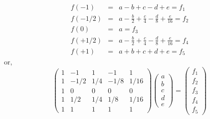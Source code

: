 \begin{eqnarray}
f(-1)   &=& a-b+c-d+e = f_1 \nonumber\\
f(-1/2) &=& a-\frac{b}{2}+\frac{c}{4}-\frac{d}{8}+\frac{e}{16} = f_2 \nonumber\\
f(0)    &=& a = f_3 \nonumber\\
f(+1/2) &=& a-\frac{b}{2}+\frac{c}{4}-\frac{d}{8}+\frac{e}{16} = f_4 \nonumber\\
f(+1)   &=& a+b+c+d+e = f_5 \nonumber
\end{eqnarray}
or, 
\begin{equation}
\left(
\begin{array}{ccccc}
 1  &  -1  &  1 &  -1 &  1 \\ 
 1  &  -1/2  &  1/4 &  -1/8 &  1/16 \\ 
 1  &   0    &  0   &   0   & 0 \\
 1  &  1/2  &  1/4 &  1/8 &  1/16 \\ 
 1  &  1  &  1 &  1 &  1 
\end{array}
\right)
\left(
\begin{array}{c}
a \\ b \\ c \\ d \\ e
\end{array}
\right)
=
\left(
\begin{array}{c}
f_1 \\ f_2 \\ f_3 \\ f_4 \\ f_5
\end{array}
\right)
\end{equation}

